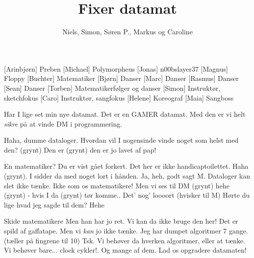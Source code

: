 \documentclass[a4paper,11pt]{article}
\title{Fixer datamat}
\author{Niels, Simon, Søren P., Markus og Caroline}
\begin{document}
\maketitle

\begin{roles}
  [Arinbjørn] Preben
  [Michael] Polymorpheus
  [Jonas] n00bslayer37
  [Magnus] Floppy
  [Buchter] Matematiker
  [Bjørn] Danser
  [Marc] Danser
  [Rasmus] Danser
  [Sean] Danser
  [Torben] Matematikerfølger og danser
  [Simon] Instruktør, sketchfokus
  [Caro] Instruktør, sangfokus
  [Helene] Koreograf
  [Maia] Sangboss
\end{roles}

\begin{props}
\end{props}

\begin{sketch}
   Har I lige set min nye datamat. Det er en GAMER datamat. Med den er vi helt \emph{sikre} på at vinde DM i programmering.

   Haha, dumme dataloger. Hvordan vil I nogensinde vinde noget som helst med den? (grynt) Den er (grynt) den er jo lavet af pap!

   En matematiker? Du er vist gået forkert. Det her er ikke handicaptoilettet.
   Haha (grynt). I sidder da med noget lort i hånden.
   Ja, heh, godt sagt M.
   Dataloger kan slet ikke tænke. Ikke som os matematikere!
   Men vi ses til DM (grynt) hehe (grynt) - hvis I da (grynt) tør komme..
   Det' nog' loooort
   (hvisker til M) Hørte du lige hvad jeg sagde til dem? Hehe

   Skide matematikere
   Men han har jo ret. Vi kan da ikke bruge den her! Det er spild af gaffatape.
   Men vi \emph{kan} jo ikke tænke. Jeg har dumpet algoritmer 7 gange. (tæller på fingrene til 10)
   Tsk. Vi behøver da hverken algoritmer, eller at tænke. Vi behøver bare... clock cykler!. Og mange af dem. Lad os opgradere datamaten!

\end{sketch}
\end{document}
